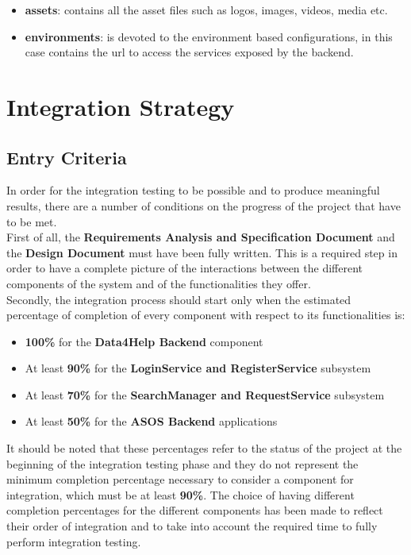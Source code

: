 \documentclass[a4paper, hidelinks, 12pt]{report}
\begin{document}
\begin{itemize}
		\item \textbf{assets}: contains all the asset files such as logos, images, videos, media etc.
		\item \textbf{environments}:  is devoted to the environment based configurations, in this case contains the url to access the services exposed by the backend.
	\end{itemize}

	\chapter{Integration Strategy}
	\section{Entry Criteria}
	\label{sec:Entry Criteria}
	In order for the integration testing to be possible and to produce meaningful results, there are a number of conditions on the progress of the project that have to be met.\\
	\quad First of all, the \textbf{Requirements Analysis and Specification Document} and the \textbf{Design Document} must have been fully written. This is a required step in order to have a complete picture of the interactions between the different components of the system and of the functionalities they offer.\\

	\quad Secondly, the integration process should start only when the estimated percentage of completion of every component with respect to its functionalities is:
	\begin{itemize}
		\item{}\textbf{100\%} for the \textbf{Data4Help Backend} component
		\item{}At least \textbf{90\%} for the \textbf{LoginService and RegisterService} subsystem
		\item{}At least \textbf{70\%} for the \textbf{SearchManager and RequestService} subsystem
		\item{}At least \textbf{50\%} for the \textbf{ASOS Backend} applications
	\end{itemize}
	It should be noted that these percentages refer to the status of the project at the beginning of the integration testing phase and they do not represent the minimum completion percentage necessary to consider a component for integration, which must be at least \textbf{90\%}. The choice of having different completion percentages for the different components has been made to reflect their order of integration and to take into account the required time to fully perform integration testing.
\end{document}
